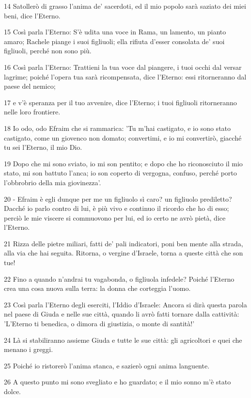 \par 14 Satollerò di grasso l'anima de' sacerdoti, ed il mio popolo sarà saziato dei miei beni, dice l'Eterno.
\par 15 Così parla l'Eterno: S'è udita una voce in Rama, un lamento, un pianto amaro; Rachele piange i suoi figliuoli; ella rifiuta d'esser consolata de' suoi figliuoli, perché non sono più.
\par 16 Così parla l'Eterno: Trattieni la tua voce dal piangere, i tuoi occhi dal versar lagrime; poiché l'opera tua sarà ricompensata, dice l'Eterno: essi ritorneranno dal paese del nemico;
\par 17 e v'è speranza per il tuo avvenire, dice l'Eterno; i tuoi figliuoli ritorneranno nelle loro frontiere.
\par 18 Io odo, odo Efraim che si rammarica: 'Tu m'hai castigato, e io sono stato castigato, come un giovenco non domato; convertimi, e io mi convertirò, giacché tu sei l'Eterno, il mio Dio.
\par 19 Dopo che mi sono sviato, io mi son pentito; e dopo che ho riconosciuto il mio stato, mi son battuto l'anca; io son coperto di vergogna, confuso, perché porto l'obbrobrio della mia giovinezza'.
\par 20 - Efraim è egli dunque per me un figliuolo sì caro? un figliuolo prediletto? Dacché io parlo contro di lui, è più vivo e continuo il ricordo che ho di esso; perciò le mie viscere si commuovono per lui, ed io certo ne avrò pietà, dice l'Eterno.
\par 21 Rizza delle pietre miliari, fatti de' pali indicatori, poni ben mente alla strada, alla via che hai seguita. Ritorna, o vergine d'Israele, torna a queste città che son tue!
\par 22 Fino a quando n'andrai tu vagabonda, o figliuola infedele? Poiché l'Eterno crea una cosa nuova sulla terra: la donna che corteggia l'uomo.
\par 23 Così parla l'Eterno degli eserciti, l'Iddio d'Israele: Ancora si dirà questa parola nel paese di Giuda e nelle sue città, quando li avrò fatti tornare dalla cattività: 'L'Eterno ti benedica, o dimora di giustizia, o monte di santità!'
\par 24 Là si stabiliranno assieme Giuda e tutte le sue città: gli agricoltori e quei che menano i greggi.
\par 25 Poiché io ristorerò l'anima stanca, e sazierò ogni anima languente.
\par 26 A questo punto mi sono svegliato e ho guardato; e il mio sonno m'è stato dolce.
